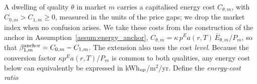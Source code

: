 A dwelling of quality $\theta$ in market $m$ carries a capitalised energy cost $C_{\theta,m}$, with $C_{0,m}>C_{1,m}\ge0$, measured in the units of the price gaps; we drop the market index when no confusion arises. We take these costs from the construction of the anchor in Assumption~\ref{assum:energy_anchor}, $C_{\theta,m}=\kappa\,p^E a(r,T)\,\bar E_{\theta,m}/P_m$, so that $\beta^{\rm anchor}_{1,m}=C_{0,m}-C_{1,m}$. The extension also uses the cost \emph{level}. Because the conversion factor $\kappa p^Ea(r,T)/P_m$ is common to both qualities, any energy cost below can equivalently be expressed in kWh$_{\rm ep}$/m$^2$/yr. Define the \emph{energy-cost ratio}

